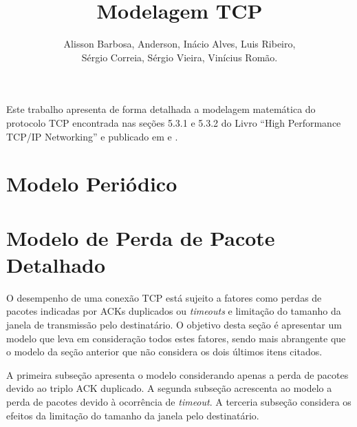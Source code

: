 \documentclass[12pt]{article}
\title{Modelagem TCP}
\author{Alisson Barbosa, Anderson, Inácio Alves, Luis Ribeiro,\\
 Sérgio Correia, Sérgio Vieira, Vinícius Romão.}
\begin{document}
 

\maketitle

     
\begin{resumo} 
  Este trabalho apresenta de forma detalhada a modelagem matemática do protocolo
  TCP encontrada nas seções 5.3.1 e 5.3.2 do Livro ``High Performance TCP/IP Networking''\cite{hassan2004high}
  e publicado em \cite{Mathis_97} e \cite{padhye1998modeling}.
\end{resumo}


\section{Modelo Periódico}



\section{Modelo de Perda de Pacote Detalhado}
O desempenho de uma conexão TCP está sujeito a fatores como perdas de pacotes indicadas por 
ACKs duplicados ou \textit{timeouts} e limitação do tamanho da janela de transmissão pelo 
destinatário. O objetivo desta seção é apresentar um modelo que leva em consideração todos 
estes fatores, sendo mais abrangente que o modelo da seção anterior que não considera os dois
últimos itens citados.

A primeira subseção apresenta o modelo considerando apenas a perda de pacotes devido ao 
triplo ACK duplicado. A segunda subseção acrescenta ao modelo a perda de pacotes devido à
ocorrência de \textit{timeout}. A terceria subseção considera os efeitos da limitação do 
tamanho da janela pelo destinatário.




\end{document}
